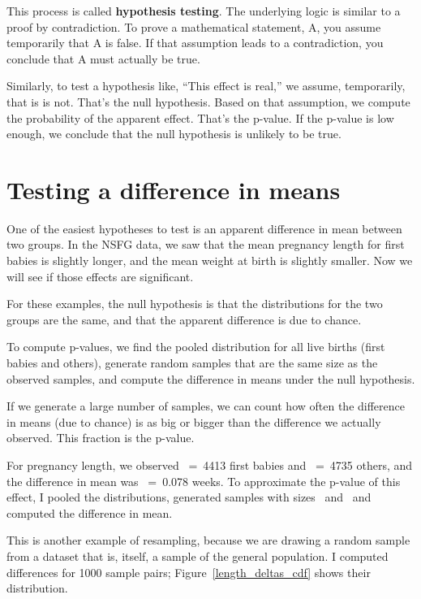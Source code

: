 \documentclass[12pt]{book}
\begin{document}
This process is called {\bf hypothesis testing}.  The underlying
logic is similar to a proof by contradiction.  To prove a mathematical
statement, A, you assume temporarily that A is false.  If that
assumption leads to a contradiction, you conclude that A must actually
be true.

Similarly, to test a hypothesis like, ``This effect is real,'' we
assume, temporarily, that is is not.  That's the null hypothesis.
Based on that assumption, we compute the probability of the apparent
effect.  That's the p-value.  If the p-value is low enough, we
conclude that the null hypothesis is unlikely to be true.


\section{Testing a difference in means}

One of the easiest hypotheses to test is an apparent difference in mean
between two groups.  In the NSFG data, we saw that the mean pregnancy
length for first babies is slightly longer, and the mean weight at
birth is slightly smaller.  Now we will see if those effects are
significant.

For these examples, the null hypothesis is that the distributions
for the two groups are the same, and that the apparent difference is
due to chance.

To compute p-values, we find the pooled distribution for all live
births (first babies and others), generate random samples that are
the same size as the observed samples, and compute the difference
in means under the null hypothesis.

If we generate a large number of samples, we can count how often the
difference in means (due to chance) is as big or bigger than the
difference we actually observed.  This fraction is the p-value.

For pregnancy length, we observed \n~=~4413 first babies and \m~=~4735
others, and the difference in mean was \mydelta~=~0.078 weeks.  To
approximate the p-value of this effect, I pooled the distributions,
generated samples with sizes \n~and \m~and computed the difference
in mean.

This is another example of resampling, because we are drawing a
random sample from a dataset that is, itself, a sample of the general
population.  I computed differences for 1000 sample pairs;
Figure~\ref{length_deltas_cdf} shows their distribution.
\end{document}
